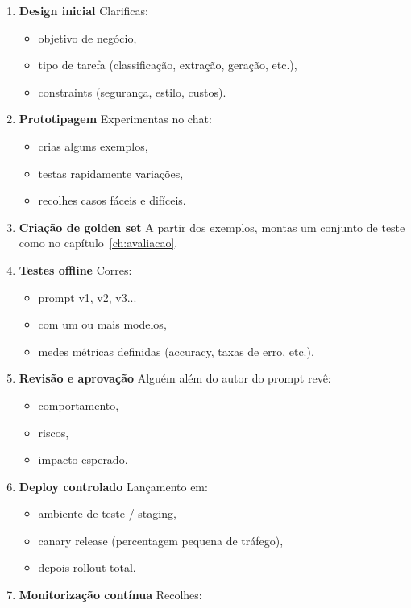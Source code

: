 \begin{enumerate}[leftmargin=*]
\item \textbf{Design inicial}
Clarificas:
\begin{itemize}[leftmargin=*]
\item objetivo de negócio,
\item tipo de tarefa (classificação, extração, geração, etc.),
\item constraints (segurança, estilo, custos).
\end{itemize}
\item \textbf{Prototipagem}
Experimentas no chat:
\begin{itemize}[leftmargin=*]
\item crias alguns exemplos,
\item testas rapidamente variações,
\item recolhes casos fáceis e difíceis.
\end{itemize}
\item \textbf{Criação de golden set}
A partir dos exemplos, montas um conjunto de teste como no capítulo~\ref{ch:avaliacao}.
\item \textbf{Testes offline}
Corres:
\begin{itemize}[leftmargin=*]
\item prompt v1, v2, v3...
\item com um ou mais modelos,
\item medes métricas definidas (accuracy, taxas de erro, etc.).
\end{itemize}
\item \textbf{Revisão e aprovação}
Alguém além do autor do prompt revê:
\begin{itemize}[leftmargin=*]
\item comportamento,
\item riscos,
\item impacto esperado.
\end{itemize}
\item \textbf{Deploy controlado}
Lançamento em:
\begin{itemize}[leftmargin=*]
\item ambiente de teste / staging,
\item canary release (percentagem pequena de tráfego),
\item depois rollout total.
\end{itemize}
\item \textbf{Monitorização contínua}
Recolhes:
\begin{itemize}[leftmargin=*]

\end{itemize}
\end{enumerate}
